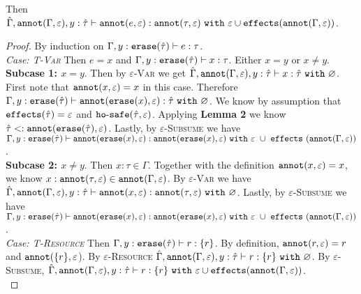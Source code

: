 \begin{appendix}
\begin{lemma}[Annotation]
\noindent
Then $\hat \Gamma, \mathtt{annot}(\Gamma, \varepsilon), y: \hat \tau \vdash \mathtt{annot}(e, \varepsilon) : \mathtt{annot}(\tau, \varepsilon)~\mathtt{with}~ \varepsilon \cup \mathtt{effects}(\mathtt{annot}(\Gamma, \varepsilon))$.
\end{lemma}

\begin{proof}
By induction on $\Gamma, y: \mathtt{erase}(\hat \tau) \vdash e: \tau$.\\

\textit{Case: \textsc{T-Var}} Then $e=x$ and $\Gamma, y: \mathtt{erase}(\hat \tau) \vdash x: \tau$. Either $x=y$ or $x \neq y$. \\

\textbf{Subcase 1: $x = y$}. Then by \textsc{$\varepsilon$-Var} we get $\hat \Gamma, \mathtt{annot}(\Gamma, \varepsilon), y: \hat \tau \vdash x: \hat \tau~\mathtt{with}~ \varnothing$. First note that $\mathtt{annot}(x, \varepsilon) = x$ in this case. Therefore $\Gamma, y: \mathtt{erase}(\hat \tau) \vdash \mathtt{annot}(\mathtt{erase}(x), \varepsilon): \hat \tau~\mathtt{with}~ \varnothing$. We know by assumption that $\mathtt{effects}(\hat \tau) = \varepsilon$ and $\mathtt{ho \hbox{-} safe}(\hat \tau, \varepsilon)$. Applying \textbf{Lemma 2} we know $\hat \tau <: \mathtt{annot}(\mathtt{erase}(\hat \tau), \varepsilon)$. Lastly, by \textsc{$\varepsilon$-Subsume} we have $\Gamma, y: \mathtt{erase}(\hat \tau) \vdash \mathtt{annot}(\mathtt{erase}(x), \varepsilon): \mathtt{annot}(\mathtt{erase}(x), \varepsilon)~\mathtt{with}~ \varepsilon~\cup~\mathtt{effects}~(\mathtt{annot}(\Gamma, \varepsilon))$. \\

\textbf{Subcase 2: $x \neq y$}. Then $x: \tau \in \Gamma$. Together with the definition $\mathtt{annot}(x, \varepsilon) = x$, we know $x: \mathtt{annot}(\tau, \varepsilon) \in \mathtt{annot}(\Gamma, \varepsilon)$. By \textsc{$\varepsilon$-Var} we have $\hat \Gamma, \mathtt{annot}(\Gamma, \varepsilon), y: \hat \tau \vdash \mathtt{annot}(x, \varepsilon): \mathtt{annot}(\tau, \varepsilon)~\mathtt{with}~ \varnothing$. Lastly, by \textsc{$\varepsilon$-Subsume} we have $\Gamma, y: \mathtt{erase}(\hat \tau) \vdash \mathtt{annot}(\mathtt{erase}(x), \varepsilon): \mathtt{annot}(\mathtt{erase}(x), \varepsilon)~\mathtt{with}~ \varepsilon~\cup~\mathtt{effects}~(\mathtt{annot}(\Gamma, \varepsilon))$.\\

\textit{Case: \textsc{T-Resource}} Then $\Gamma, y: \mathtt{erase}(\hat \tau) \vdash r : \{ r \}$. By definition, $\mathtt{annot}(r, \varepsilon) = r$ and $\mathtt{annot}(\{ r \}, \varepsilon$). By \textsc{$\varepsilon$-Resource}  $\hat \Gamma, \mathtt{annot}(\Gamma, \varepsilon), y: \hat \tau \vdash r: \{ r \}~\mathtt{with}~ \varnothing$. By \textsc{$\varepsilon$-Subsume}, $\hat \Gamma, \mathtt{annot}(\Gamma, \varepsilon), y: \hat \tau \vdash r: \{ r \}~\mathtt{with}~ \varepsilon \cup \mathtt{effects}(\mathtt{annot}(\Gamma, \varepsilon))$.\\


\end{proof}
\end{appendix}
